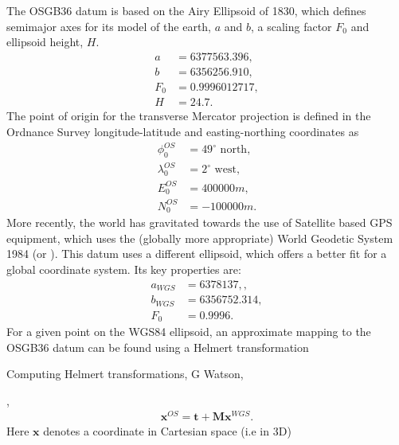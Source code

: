 \documentclass[letterpaper,10pt,english]{sphinxmanual}
\begin{document}
The OSGB36 datum is based on the Airy Ellipsoid of 1830, which defines
semimajor axes for its model of the earth, \(a\) and \(b\), a scaling
factor \(F_0\) and ellipsoid height, \(H\).
\begin{equation*}
\begin{split}a &= 6377563.396, \\
b &= 6356256.910, \\
F_0 &= 0.9996012717, \\
H &= 24.7.\end{split}
\end{equation*}
The point of origin for the transverse Mercator projection is defined in the
Ordnance Survey longitude-latitude and easting-northing coordinates as
\begin{equation*}
\begin{split}\phi^{OS}_0 &= 49^\circ \mbox{ north}, \\
\lambda^{OS}_0 &= 2^\circ \mbox{ west}, \\
E^{OS}_0 &= 400000 m, \\
N^{OS}_0 &= -100000 m.\end{split}
\end{equation*}
More recently, the world has gravitated towards the use of Satellite based GPS
equipment, which uses the (globally more appropriate) World Geodetic System
1984 (or ). This datum uses a different ellipsoid, which offers a
better fit for a global coordinate system. Its key properties are:
\begin{equation*}
\begin{split}a_{WGS} &= 6378137,, \\
b_{WGS} &= 6356752.314, \\
F_0 &= 0.9996.\end{split}
\end{equation*}
For a given point on the WGS84 ellipsoid, an approximate mapping to the
OSGB36 datum can be found using a Helmert transformation %
\begin{footnote}[3]\sphinxAtStartFootnote
Computing Helmert transformations, G Watson, 
%
\end{footnote},
\begin{equation*}
\begin{split}\mathbf{x}^{OS} = \mathbf{t}+\mathbf{M}\mathbf{x}^{WGS}.\end{split}
\end{equation*}
Here \(\mathbf{x}\) denotes a coordinate in Cartesian space (i.e in 3D)
\end{document}
